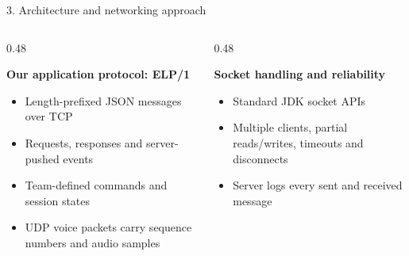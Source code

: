 \documentclass[10pt,t,aspectratio=169]{beamer}
\newenvironment{topicblock}[1]{%
  \par\vspace{0.12cm}%
  {\normalsize\bfseries\color{hustprimary}#1}\par\vspace{-0.08cm}%
}{\par}
\begin{document}
\begin{frame}{3. Architecture and networking approach}
  \begin{columns}[T,onlytextwidth]
    \begin{column}{0.48\textwidth}
      \begin{topicblock}{Our application protocol: ELP/1}
        \small
        \begin{itemize}
          \setlength{\itemsep}{0.22em}
          \setlength{\parsep}{0pt}
          \item Length-prefixed JSON messages over TCP
          \item Requests, responses and server-pushed events
          \item Team-defined commands and session states
          \item UDP voice packets carry sequence numbers and audio samples
        \end{itemize}
      \end{topicblock}
    \end{column}
    \begin{column}{0.48\textwidth}
      \begin{topicblock}{Socket handling and reliability}
        \small
        \begin{itemize}
          \setlength{\itemsep}{0.22em}
          \setlength{\parsep}{0pt}
          \item Standard JDK socket APIs
          \item Multiple clients, partial reads/writes, timeouts and disconnects
          \item Server logs every sent and received message
        \end{itemize}
      \end{topicblock}
    \end{column}
  \end{columns}
\end{frame}
\end{document}
